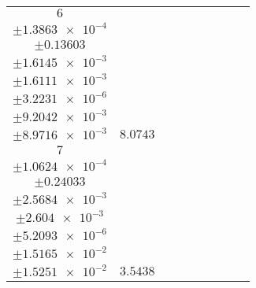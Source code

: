 \documentclass[8pt]{article}
\begin{document}
\begin{longtable}[l]{c c c c c c c c c}
$\num{6}$ & \begin{tabular}[c]{@{}c@{}}$\num{6.3958e-2}$ \\ $\pm\num{1.3863e-4}$\end{tabular} & \begin{tabular}[c]{@{}c@{}}$\num{0.96095}$ \\ $\pm\num{0.13603}$\end{tabular} & \begin{tabular}[c]{@{}c@{}}$\num{7.1792}$ \\ $\pm\num{1.6145e-3}$\end{tabular} & \begin{tabular}[c]{@{}c@{}}$\num{737.74}$ \\ $\pm\num{1.6111e-3}$\end{tabular} & \begin{tabular}[c]{@{}c@{}}$\num{1.4759}$ \\ $\pm\num{3.2231e-6}$\end{tabular} & \begin{tabular}[c]{@{}c@{}}$\num{4.5358}$ \\ $\pm\num{9.2042e-3}$\end{tabular} & \begin{tabular}[c]{@{}c@{}}$\num{4.4713}$ \\ $\pm\num{8.9716e-3}$\end{tabular} & $\num{8.0743}$\\
$\num{7}$ & \begin{tabular}[c]{@{}c@{}}$\num{2.6666e-2}$ \\ $\pm\num{1.0624e-4}$\end{tabular} & \begin{tabular}[c]{@{}c@{}}$\num{1.1563}$ \\ $\pm\num{0.24033}$\end{tabular} & \begin{tabular}[c]{@{}c@{}}$\num{9.3909}$ \\ $\pm\num{2.5684e-3}$\end{tabular} & \begin{tabular}[c]{@{}c@{}}$\num{739.95}$ \\ $\pm\num{2.604e-3}$\end{tabular} & \begin{tabular}[c]{@{}c@{}}$\num{1.4803}$ \\ $\pm\num{5.2093e-6}$\end{tabular} & \begin{tabular}[c]{@{}c@{}}$\num{3.7929}$ \\ $\pm\num{1.5165e-2}$\end{tabular} & \begin{tabular}[c]{@{}c@{}}$\num{3.8342}$ \\ $\pm\num{1.5251e-2}$\end{tabular} & $\num{3.5438}$\\
\bottomrule
\end{longtable}
\end{document}
